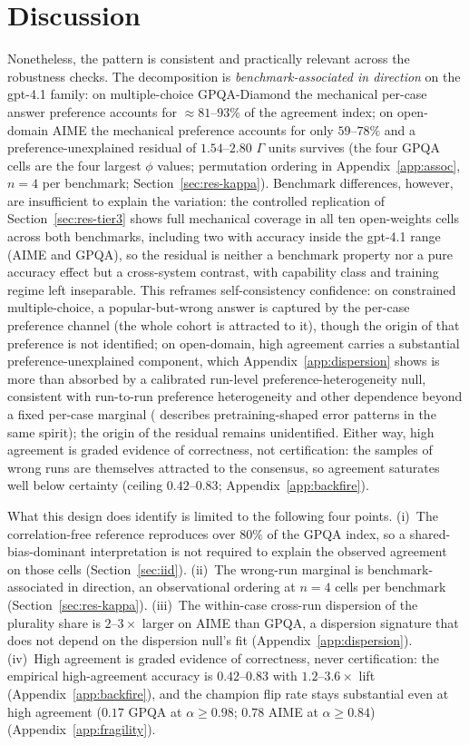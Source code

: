 \documentclass{article}
\newcommand{\agreementIndex}{\Gamma}
\begin{document}
\section{Discussion}
\label{sec:discussion}

Nonetheless, the pattern is consistent and practically relevant across the robustness checks. The decomposition is
\emph{benchmark-associated in direction} on the gpt-4.1 family: on multiple-choice GPQA-Diamond the
mechanical per-case answer preference accounts for $\approx81$--$93\%$
of the agreement index; on open-domain AIME the mechanical preference
accounts for
only $59$--$78\%$ and a preference-unexplained residual of $1.54$--$2.80$ $\agreementIndex$
units survives (the four GPQA cells are the four largest $\phi$ values;
permutation ordering in Appendix~\ref{app:assoc}, $n=4$ per benchmark;
Section~\ref{sec:res-kappa}).
Benchmark differences, however, are insufficient to explain the
variation: the controlled replication of Section~\ref{sec:res-tier3}
shows full mechanical coverage in all ten open-weights cells
across both benchmarks, including two with accuracy inside the gpt-4.1 range
(AIME and GPQA),
so the residual is neither a benchmark property nor a pure accuracy
effect but a cross-system contrast, with capability class and training
regime left inseparable.
This reframes self-consistency confidence: on
constrained multiple-choice, a popular-but-wrong answer is captured by
the per-case preference channel (the whole cohort is attracted to it),
though the origin of that preference is not identified; on open-domain,
high agreement
carries a substantial preference-unexplained component, which
Appendix~\ref{app:dispersion} shows is more than absorbed by a calibrated run-level
preference-heterogeneity null, consistent with run-to-run preference
heterogeneity and other dependence beyond a fixed per-case marginal
(\cite{mccoy2024} describes pretraining-shaped error patterns in the
same spirit); the origin of the residual remains unidentified. Either
way,
high agreement is graded evidence of correctness, not certification: the
samples of wrong runs are themselves attracted to the consensus, so
agreement saturates well below certainty (ceiling $0.42$--$0.83$;
Appendix~\ref{app:backfire}).

What this design does identify is limited to the following four points. (i)~The correlation-free reference reproduces over $80\%$ of the GPQA
index, so a shared-bias-dominant interpretation is not required to
explain the observed agreement on those cells
(Section~\ref{sec:iid}).
(ii)~The wrong-run marginal is benchmark-associated in direction, an
observational ordering at $n=4$ cells per benchmark
(Section~\ref{sec:res-kappa}). (iii)~The within-case cross-run
dispersion of the plurality share is $2$--$3\times$ larger on AIME than
GPQA, a dispersion signature that does not depend on the dispersion
null's fit (Appendix~\ref{app:dispersion}). (iv)~High agreement is
graded evidence of correctness, never certification: the empirical
high-agreement accuracy is $0.42$--$0.83$ with $1.2$--$3.6\times$ lift
(Appendix~\ref{app:backfire}), and the champion flip rate
stays substantial even at high agreement ($0.17$ GPQA at $\alpha\ge0.98$;
$0.78$ AIME at $\alpha\ge0.84$)
(Appendix~\ref{app:fragility}).
\end{document}
